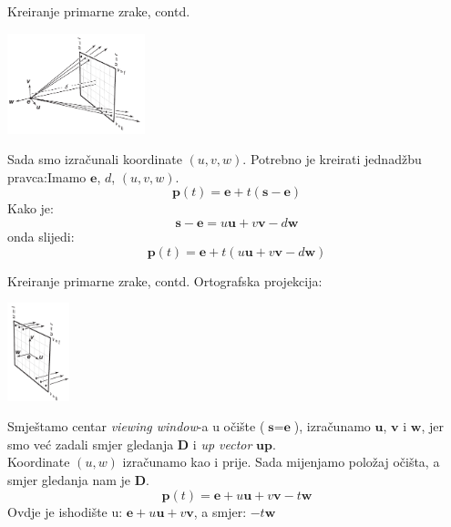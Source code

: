 \documentclass[9pt]{beamer}
\begin{document}
\begin{frame}{Kreiranje primarne zrake, contd.}
\begin{center}
\includegraphics[width=4cm]{slike/ray_viewing_window_perspective.png} 
\end{center} 
Sada smo izračunali koordinate $(u,v, w)$. Potrebno je kreirati jednadžbu pravca:Imamo $\textbf{e}$, $d$, $(u,v, w)$.
$$\textbf{p}(t) = \textbf{e} + t(\textbf{s} - \textbf{e})$$
Kako je:
$$\textbf{s} - \textbf{e} = u\textbf{u} + v\textbf{v} - d\textbf{w}$$
onda slijedi:
$$\textbf{p}(t) = \textbf{e} + t(u\textbf{u} + v\textbf{v} - d\textbf{w})$$
\end{frame}


\begin{frame}{Kreiranje primarne zrake, contd.}
Ortografska projekcija:
\begin{center}
\includegraphics[width=1.8cm]{slike/ray_viewing_window_orthografic.png} 
\end{center} 
Smještamo centar \textit{viewing window}-a u očište ($\textbf{s} = \textbf{e}$), izračunamo $\textbf{u}$, $\textbf{v}$ i $\textbf{w}$, jer smo već zadali smjer gledanja $\textbf{D}$ i \textit{up vector} $\textbf{up}$.\\
Koordinate $(u,w)$ izračunamo kao i prije. Sada mijenjamo položaj očišta, a smjer gledanja nam je $\textbf{D}$.
$$\textbf{p}(t) = \textbf{e} + u\textbf{u} + v\textbf{v} - t\textbf{w}$$
Ovdje je ishodište u: $\textbf{e} + u\textbf{u} + v\textbf{v}$, a smjer:
$- t\textbf{w}$
\end{frame}
\end{document}
